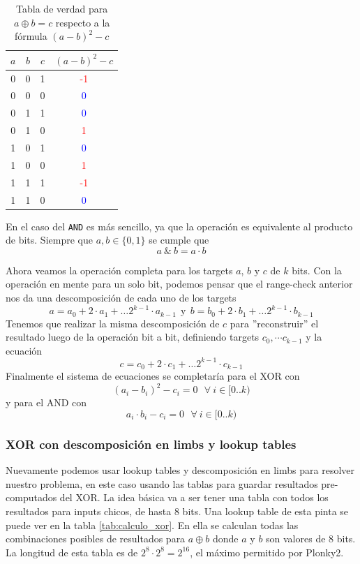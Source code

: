 \begin{table}
\begin{center}
\begin{tabular}{cccc}
\toprule
$a$ & $b$ & $c$ & $(a-b)^2-c$ \\
\midrule
0 & 0 & 1 & \textcolor{red}{-1} \\
0 & 0 & 0 & \textcolor{blue}{0} \\
0 & 1 & 1 & \textcolor{blue}{0} \\
0 & 1 & 0 & \textcolor{red}{1} \\
1 & 0 & 1 & \textcolor{blue}{0} \\
1 & 0 & 0 & \textcolor{red}{1} \\
1 & 1 & 1 & \textcolor{red}{-1} \\
1 & 1 & 0 & \textcolor{blue}{0} \\
\bottomrule
\end{tabular}
\caption{Tabla de verdad para $a \oplus b =c$ respecto a la fórmula $(a-b)^2-c$}
\label{tab:verdad_xor}
\end{center}
\end{table}

En el caso del \texttt{AND} es más sencillo, ya que la operación es equivalente al producto de bits. Siempre que $a,b \in \{0,1\}$ se cumple que
$$a ~\&~ b = a \cdot b$$

Ahora veamos la operación completa para los targets $a$, $b$ y $c$ de $k$ bits. Con la operación en mente para un solo bit, podemos pensar que el range-check anterior nos da una descomposición de cada uno de los targets 
$$a = a_0 + 2\cdot a_1 + \dots 2^{k-1}\cdot a_{k-1}~~\text{y}~~b = b_0 + 2\cdot b_1 + \dots 2^{k-1}\cdot b_{k-1}$$
Tenemos que realizar la misma descomposición de $c$ para ''reconstruir'' el resultado luego de la operación bit a bit, definiendo targets $c_0, \cdots c_{k-1}$ y la ecuación 
$$c = c_0 + 2\cdot c_1 + \dots 2^{k-1}\cdot c_{k-1}$$
Finalmente el sistema de ecuaciones se completaría para el XOR con
$$(a_i-b_i)^2-c_i=0 ~~~ \forall~ i \in [0..k)$$
y para el AND con
$$a_i\cdot b_i - c_i = 0 ~~~ \forall~i \in [0..k)$$

\subsubsection{\textbf{XOR con descomposición en limbs y lookup tables}}
Nuevamente podemos usar lookup tables y descomposición en limbs para resolver nuestro problema, en este caso usando las tablas para guardar resultados pre-computados del XOR. La idea básica va a ser tener una tabla con todos los resultados para inputs chicos, de hasta 8 bits. Una lookup table de esta pinta se puede ver en la tabla \ref{tab:calculo_xor}. En ella se calculan todas las combinaciones posibles de resultados para $a \oplus b$ donde $a$ y $b$ son valores de 8 bits. La longitud de esta tabla es de $2^8 \cdot 2^8 = 2^{16}$, el máximo permitido por Plonky2. 

